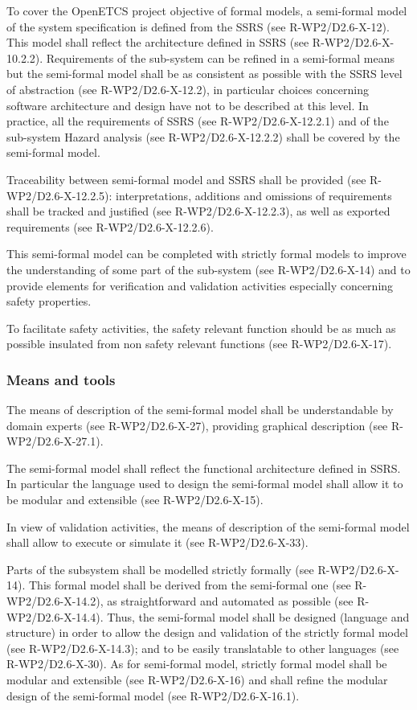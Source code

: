 To cover the OpenETCS project objective  of formal models, a semi-formal model of the system  specification is defined from  the SSRS (see R-WP2/D2.6-X-12). This model shall reflect the architecture defined in SSRS (see R-WP2/D2.6-X-10.2.2). Requirements of the sub-system can be refined in a semi-formal means but the semi-formal model  shall be as consistent as possible with the SSRS level of abstraction (see R-WP2/D2.6-X-12.2), in particular choices concerning software architecture and design have not to be described at this level.
In practice, all the requirements of SSRS (see R-WP2/D2.6-X-12.2.1) and of the sub-system Hazard analysis (see R-WP2/D2.6-X-12.2.2) shall be covered by the semi-formal model.

Traceability between semi-formal model and SSRS shall be provided (see R-WP2/D2.6-X-12.2.5): interpretations, additions and omissions of requirements shall be tracked and justified (see R-WP2/D2.6-X-12.2.3), as well as exported requirements  (see R-WP2/D2.6-X-12.2.6).

This semi-formal model can be completed with strictly formal models to improve the understanding of some part of the sub-system (see R-WP2/D2.6-X-14) and to  provide elements for verification and validation activities especially concerning safety properties.

To facilitate safety activities, the safety relevant function should be as much as possible insulated from non safety relevant functions (see R-WP2/D2.6-X-17).


\subsubsection{Means and tools}

The means of description of the semi-formal model shall be understandable by domain experts (see R-WP2/D2.6-X-27), providing graphical  description (see R-WP2/D2.6-X-27.1).

The semi-formal model shall reflect the functional architecture defined in SSRS. In particular the language used to  design the semi-formal model shall allow it to be modular and extensible (see R-WP2/D2.6-X-15).

In view of validation activities, the means of description of the semi-formal model shall allow to execute or simulate it (see R-WP2/D2.6-X-33).

Parts of the subsystem shall be modelled strictly formally (see R-WP2/D2.6-X-14). This formal model shall be derived from the semi-formal one (see R-WP2/D2.6-X-14.2), as straightforward and automated as possible (see R-WP2/D2.6-X-14.4). Thus, the semi-formal model shall be designed (language and structure) in order to allow the design and validation of the strictly formal model (see R-WP2/D2.6-X-14.3); and to be easily translatable to other languages (see R-WP2/D2.6-X-30).
As for semi-formal model, strictly formal model shall be modular and extensible (see R-WP2/D2.6-X-16) and shall refine the modular design of the semi-formal model (see R-WP2/D2.6-X-16.1).


